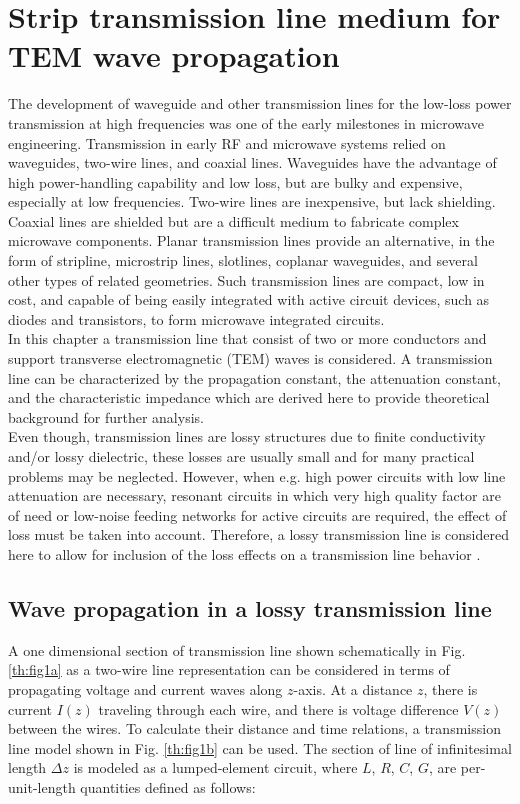 \chapter{Strip transmission line medium for TEM wave propagation}\label{theory}

\indent The development of waveguide and other transmission lines for the low-loss power transmission at high frequencies was one of the early milestones in microwave engineering. Transmission in early RF and microwave systems relied on waveguides, two-wire lines, and coaxial lines. Waveguides have the advantage of high power-handling capability and low loss, but are bulky and expensive, especially at low frequencies. Two-wire lines are inexpensive, but lack shielding. Coaxial lines are shielded but are a difficult medium to fabricate complex microwave components. Planar transmission lines provide an alternative, in the form of stripline, microstrip lines, slotlines, coplanar waveguides, and several other types of related geometries. Such transmission lines are compact, low in cost, and capable of being easily integrated with active circuit devices, such as diodes and transistors, to form microwave integrated circuits.
\\
\indent In this chapter a transmission line that consist of two or more conductors and support transverse electromagnetic (TEM) waves is considered. A transmission line can be characterized by the propagation constant, the attenuation constant, and the characteristic impedance \cite{balanis} which are derived here to provide theoretical background for further analysis.
\\
\indent Even though, transmission lines are lossy structures due to finite conductivity and/or lossy dielectric, these losses are usually small and for many practical problems may be neglected. However, when e.g. high power circuits with low line attenuation are necessary, resonant circuits in which very high quality factor are of need or low-noise feeding networks for active circuits are required, the effect of loss must be taken into account. Therefore, a lossy transmission line is considered here to allow for inclusion of the loss effects on a transmission line behavior \cite{pozar}.


\section{Wave propagation in a lossy transmission line}\label{th:lossy}

\indent A one dimensional section of transmission line shown schematically in Fig. \ref{th:fig1a} as a two-wire line representation can be considered in terms of propagating voltage and current waves along $z$-axis. At a distance $z$, there is current $I(z)$ traveling through each wire, and there is voltage difference $V(z)$ between the wires. To calculate their distance and time relations, a transmission line model shown in Fig. \ref{th:fig1b} can be used. The section of line of infinitesimal length $\Delta z$ is modeled as a lumped-element circuit, where $L$, $R$, $C$, $G$, are per-unit-length quantities defined as follows:

